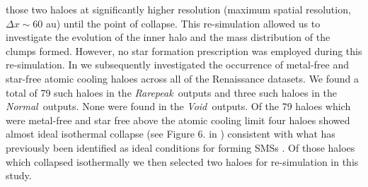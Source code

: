 \documentclass[twocolumn,iop,revtex4]{openjournal}
\newcommand{\rarepeak} {\textit{Rarepeak~}}
\newcommand{\normal} {\textit{Normal~}}
\newcommand{\void} {\textit{Void~}}
\begin{document}
 those two haloes at significantly higher resolution (maximum spatial resolution,
 $\Delta x \sim 60$ au) until the point of collapse. This re-simulation allowed us to investigate
 the evolution of the inner halo and the mass distribution of the clumps formed. However, no star
 formation prescription was employed during this re-simulation. In \cite{Regan_2020} we subsequently
 investigated the occurrence of metal-free and star-free atomic cooling haloes across all of the
 Renaissance datasets. We found a total of 79 such haloes in the
 \rarepeak outputs and three such haloes in the \normal outputs. None were found in the \void outputs.
 Of the 79 haloes which were metal-free and star free above the atomic cooling limit four haloes showed almost ideal isothermal collapse (see Figure 6. in \cite{Regan_2020}) consistent with what has previously been identified
 as ideal conditions for forming SMSs \citep{Inayoshi_2014, Becerra_2015, Latif_2016a,
   Regan_2017, Chon_2017b, Regan_2018b}. Of those haloes which collapsed isothermally we then
 selected two haloes for re-simulation in this study. \\
\end{document}
